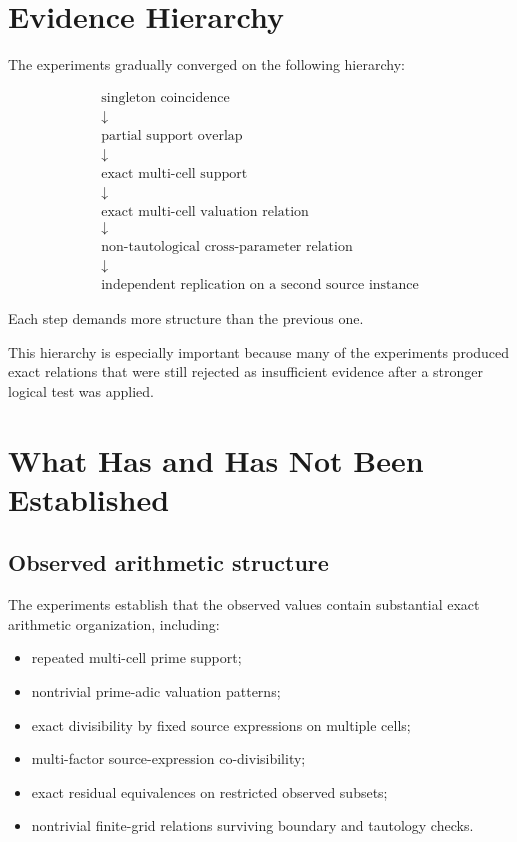 \documentclass[11pt,a4paper]{article}
\begin{document}
\section{Evidence Hierarchy}

The experiments gradually converged on the following hierarchy:

\[
\boxed{
\begin{array}{c}
\text{singleton coincidence}\\
\downarrow\\
\text{partial support overlap}\\
\downarrow\\
\text{exact multi-cell support}\\
\downarrow\\
\text{exact multi-cell valuation relation}\\
\downarrow\\
\text{non-tautological cross-parameter relation}\\
\downarrow\\
\text{independent replication on a second source instance}
\end{array}
}
\]

Each step demands more structure than the previous one.

This hierarchy is especially important because many of the experiments produced exact relations that were still rejected as insufficient evidence after a stronger logical test was applied.

\section{What Has and Has Not Been Established}

\subsection{Observed arithmetic structure}

The experiments establish that the observed values contain substantial exact arithmetic organization, including:

\begin{itemize}[leftmargin=1.5em]
  \item repeated multi-cell prime support;
  \item nontrivial prime-adic valuation patterns;
  \item exact divisibility by fixed source expressions on multiple cells;
  \item multi-factor source-expression co-divisibility;
  \item exact residual equivalences on restricted observed subsets;
  \item nontrivial finite-grid relations surviving boundary and tautology checks.
\end{itemize}
\end{document}
